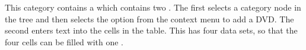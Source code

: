 
This category contains a \gdcase{} which contains two \gdcases{}. The first selects a category node in the tree and then selects the option from the context menu to add a DVD. The second \gdcase{} enters text into the cells in the table. This \gdcase{} has four data sets, so that the four cells can be filled with one \gdcase{}. 
